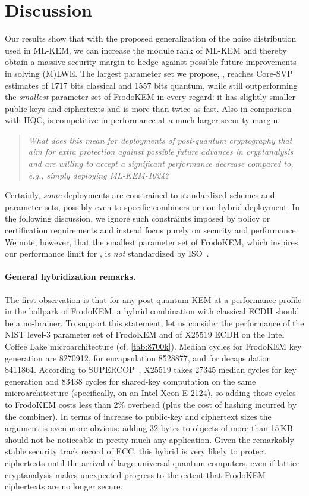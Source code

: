 \section{Discussion}
\label{sec:discussion}

Our results show that with the proposed generalization of the noise distribution used in ML-KEM, 
we can increase the module rank of ML-KEM and thereby obtain a massive security margin to hedge
against possible future improvements in solving (M)LWE. The largest
parameter set we propose, , reaches Core-SVP estimates of 1717 bits classical and 1557 bits quantum,
while still outperforming the \emph{smallest} parameter set of FrodoKEM in every regard:
it has slightly smaller public keys and ciphertexts and is more than twice as fast.
Also in comparison with HQC, \kaiburr is competitive in performance at a much larger
security margin. 

\begin{quote}
  \emph{What does this mean for deployments of post-quantum cryptography that 
aim for extra protection against possible future advances in cryptanalysis and are 
willing to accept a significant performance decrease compared to, e.g., simply deploying
  ML-KEM-1024?}
\end{quote}

Certainly, \emph{some} deployments are constrained to standardized schemes and parameter
sets, possibly even to specific combiners or non-hybrid deployment. In the following 
discussion, we ignore such constraints imposed by policy or certification requirements
and instead focus purely on security and performance. We note, however, that the smallest parameter
set of FrodoKEM, which inspires our performance limit for \kaiburr, is \emph{not} standardized
by ISO~\cite{San26}.

\paragraph{General hybridization remarks.}
The first observation is that for any post-quantum KEM at a performance profile in the ballpark of FrodoKEM,
a hybrid combination with classical ECDH should be a no-brainer. To support this 
statement, let us consider the performance of the NIST level-3 parameter set of FrodoKEM
and of X25519 ECDH on the Intel Coffee Lake microarchitecture (cf. \cref{tab:8700k}). 
Median cycles for FrodoKEM key generation are 8270912, for encapsulation 8528877,
and for decapsulation 8411864. 
According to SUPERCOP~\cite{ebacs}, X25519 takes 27345 median cycles for
key generation and 83438 cycles for shared-key computation on the same
microarchitecture (specifically, on an Intel Xeon E-2124), so adding those
cycles to FrodoKEM costs less than 2\% overhead (plus the cost of
hashing incurred by the combiner). In terms of increase to public-key and
ciphertext sizes the argument is even more obvious: adding 32 bytes to
objects of more than 15\,KB should not be noticeable in pretty much any
application. Given the remarkably stable security track record of ECC,
this hybrid is very likely to protect ciphertexts until the arrival of
large universal quantum computers, even if lattice cryptanalysis makes
unexpected progress to the extent that FrodoKEM ciphertexts are no longer
secure.

